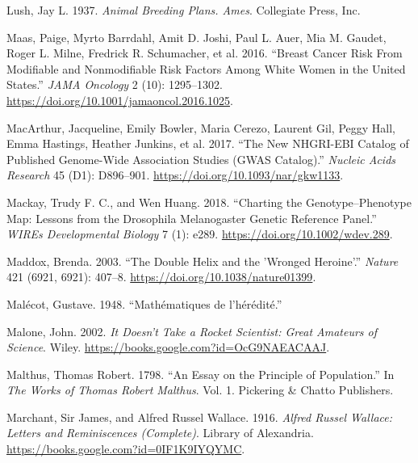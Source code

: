 \documentclass[
]{book}
\newlength{\cslhangindent}
\newlength{\cslentryspacingunit} %
\newenvironment{CSLReferences}[2] %
 {%
  \setlength{\parindent}{0pt}
  \ifodd #1
  \let\oldpar\par
  \def\par{\hangindent=\cslhangindent\oldpar}
  \fi
  \setlength{\parskip}{#2\cslentryspacingunit}
 }%
 {}
\begin{document}
\begin{CSLReferences}{1}{0}
\leavevmode{}%
Lush, Jay L. 1937. \emph{Animal Breeding Plans. {Ames}}. {Collegiate Press, Inc}.

\leavevmode{}%
Maas, Paige, Myrto Barrdahl, Amit D. Joshi, Paul L. Auer, Mia M. Gaudet, Roger L. Milne, Fredrick R. Schumacher, et al. 2016. {``Breast {Cancer Risk From Modifiable} and {Nonmodifiable Risk Factors Among White Women} in the {United States}.''} \emph{JAMA Oncology} 2 (10): 1295--1302. \url{https://doi.org/10.1001/jamaoncol.2016.1025}.

\leavevmode{}%
MacArthur, Jacqueline, Emily Bowler, Maria Cerezo, Laurent Gil, Peggy Hall, Emma Hastings, Heather Junkins, et al. 2017. {``The New {NHGRI-EBI Catalog} of Published Genome-Wide Association Studies ({GWAS Catalog}).''} \emph{Nucleic Acids Research} 45 (D1): D896--901. \url{https://doi.org/10.1093/nar/gkw1133}.

\leavevmode{}%
Mackay, Trudy F. C., and Wen Huang. 2018. {``Charting the Genotype--Phenotype Map: Lessons from the {Drosophila} Melanogaster {Genetic Reference Panel}.''} \emph{WIREs Developmental Biology} 7 (1): e289. \url{https://doi.org/10.1002/wdev.289}.

\leavevmode{}%
Maddox, Brenda. 2003. {``The Double Helix and the 'Wronged Heroine'.''} \emph{Nature} 421 (6921, 6921): 407--8. \url{https://doi.org/10.1038/nature01399}.

\leavevmode{}%
Malécot, Gustave. 1948. {``Mathématiques de l'hérédité.''}

\leavevmode{}%
Malone, John. 2002. \emph{It {Doesn}'t {Take} a {Rocket Scientist}: {Great Amateurs} of {Science}}. {Wiley}. \url{https://books.google.com?id=OcG9NAEACAAJ}.

\leavevmode{}%
Malthus, Thomas Robert. 1798. {``An Essay on the Principle of Population.''} In \emph{The Works of {Thomas Robert Malthus}}. Vol. 1. {Pickering \& Chatto Publishers}.

\leavevmode{}%
Marchant, Sir James, and Alfred Russel Wallace. 1916. \emph{Alfred {Russel Wallace}: {Letters} and {Reminiscences} ({Complete})}. {Library of Alexandria}. \url{https://books.google.com?id=0IF1K9IYQYMC}.


\end{CSLReferences}
\end{document}
